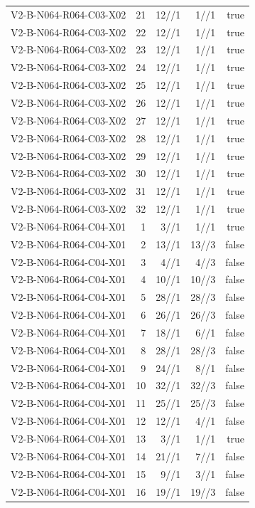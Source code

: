 {\begin{longtable}{lrrrr}
V2-B-N064-R064-C03-X02 & 21 & 12//1 & 1//1 & true \\
V2-B-N064-R064-C03-X02 & 22 & 12//1 & 1//1 & true \\
V2-B-N064-R064-C03-X02 & 23 & 12//1 & 1//1 & true \\
V2-B-N064-R064-C03-X02 & 24 & 12//1 & 1//1 & true \\
V2-B-N064-R064-C03-X02 & 25 & 12//1 & 1//1 & true \\
V2-B-N064-R064-C03-X02 & 26 & 12//1 & 1//1 & true \\
V2-B-N064-R064-C03-X02 & 27 & 12//1 & 1//1 & true \\
V2-B-N064-R064-C03-X02 & 28 & 12//1 & 1//1 & true \\
V2-B-N064-R064-C03-X02 & 29 & 12//1 & 1//1 & true \\
V2-B-N064-R064-C03-X02 & 30 & 12//1 & 1//1 & true \\
V2-B-N064-R064-C03-X02 & 31 & 12//1 & 1//1 & true \\
V2-B-N064-R064-C03-X02 & 32 & 12//1 & 1//1 & true \\
V2-B-N064-R064-C04-X01 & 1 & 3//1 & 1//1 & true \\
V2-B-N064-R064-C04-X01 & 2 & 13//1 & 13//3 & false \\
V2-B-N064-R064-C04-X01 & 3 & 4//1 & 4//3 & false \\
V2-B-N064-R064-C04-X01 & 4 & 10//1 & 10//3 & false \\
V2-B-N064-R064-C04-X01 & 5 & 28//1 & 28//3 & false \\
V2-B-N064-R064-C04-X01 & 6 & 26//1 & 26//3 & false \\
V2-B-N064-R064-C04-X01 & 7 & 18//1 & 6//1 & false \\
V2-B-N064-R064-C04-X01 & 8 & 28//1 & 28//3 & false \\
V2-B-N064-R064-C04-X01 & 9 & 24//1 & 8//1 & false \\
V2-B-N064-R064-C04-X01 & 10 & 32//1 & 32//3 & false \\
V2-B-N064-R064-C04-X01 & 11 & 25//1 & 25//3 & false \\
V2-B-N064-R064-C04-X01 & 12 & 12//1 & 4//1 & false \\
V2-B-N064-R064-C04-X01 & 13 & 3//1 & 1//1 & true \\
V2-B-N064-R064-C04-X01 & 14 & 21//1 & 7//1 & false \\
V2-B-N064-R064-C04-X01 & 15 & 9//1 & 3//1 & false \\
V2-B-N064-R064-C04-X01 & 16 & 19//1 & 19//3 & false \\

\end{longtable}}
